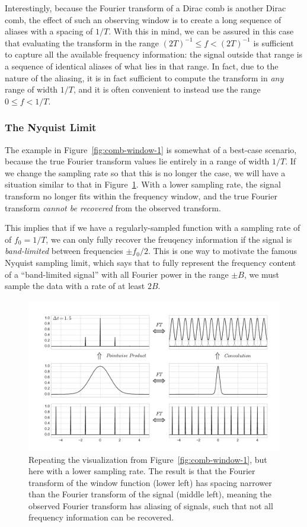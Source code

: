 \documentclass[preprint]{aastex}
\newcommand{\fig}[1]{Figure~\ref{fig:#1}}
\newcommand{\figlabel}[1]{\label{fig:#1}}
\newcommand{\sectlabel}[1]{\label{sect:#1}}
\begin{document}
Interestingly, because the Fourier transform of a Dirac comb is another Dirac
comb, the effect of such an observing window is to create a long sequence
of aliases with a spacing of $1/T$.
With this in mind, we can be assured in this case that evaluating the
transform in the range $(2T)^{-1} \le f < (2T)^{-1}$ is sufficient to capture
all the available frequency information:
the signal outside that range is a sequence of identical aliases of
what lies in that range.
In fact, due to the nature of the aliasing, it is in fact sufficient to
compute the transform in {\it any} range of width $1/T$, and it is often
convenient to instead use the range $0 \le f < 1/T$.

\subsubsection{The Nyquist Limit}
\sectlabel{nyquist}

The example in \fig{comb-window-1} is somewhat of a best-case scenario, because
the true Fourier transform values lie entirely in a range of width $1/T$.
If we change the sampling rate so that this is no longer the case, we will
have a situation similar to that in \fig{comb-window-2}.
With a lower sampling rate, the signal transform no longer fits within the
frequency window, and the true Fourier transform {\it cannot be recovered}
from the observed transform.

This implies that if we have a regularly-sampled function with a sampling
rate of of $f_0 = 1/T$, we can only fully recover the freuqency information
if the signal is {\it band-limited} between frequencies $\pm f_0/2$.
This is one way to motivate the famous Nyquist sampling limit, which says
that to fully represent the frequency content of a ``band-limited signal''
with all Fourier power in the range $\pm B$, we must sample the data with a
rate of at least $2B$.

\begin{figure}[ht]
  \centering
  \includegraphics[width=\textwidth]{fig08_comb_window_2}
  \caption{Repeating the visualization from \fig{comb-window-1}, but here with
    a lower sampling rate. The result is that the Fourier transform of the
    window function (lower left) has spacing narrower than the Fourier transform
    of the signal (middle left), meaning the observed Fourier transform has
    aliasing of signals, such that not all frequency information can be
    recovered.
    \figlabel{comb-window-2}}
\end{figure}
\end{document}
